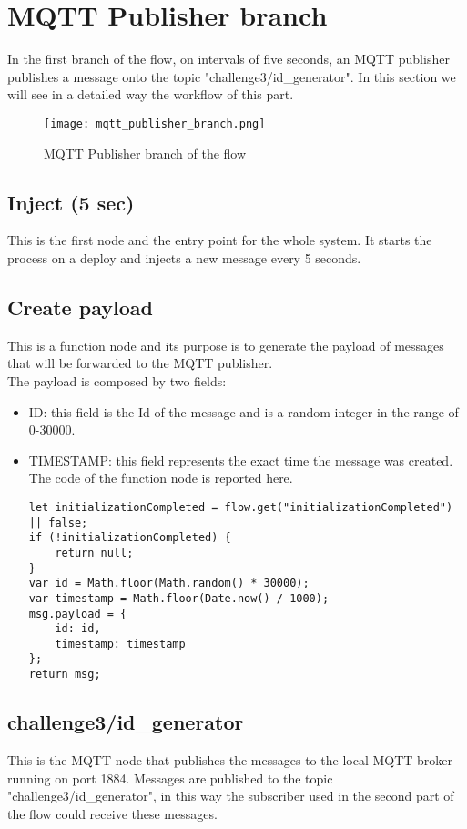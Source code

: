 \section{MQTT Publisher branch}
\label{sec:publisher_branch}
In the first branch of the flow, on intervals of five seconds, an MQTT publisher publishes a message onto the topic "challenge3/id\_generator". In this section we will see in a detailed way the workflow of this part.
\begin{figure}[H]
    \centering
    \texttt{[image: mqtt\_publisher\_branch.png]}
    \caption{MQTT Publisher branch of the flow}
\end{figure}

\subsection{Inject (5 sec)}
This is the first node and the entry point for the whole system. It starts the process on a deploy and injects a new message every 5 seconds.

\subsection{Create payload}
This is a function node and its purpose is to generate the payload of messages that will be forwarded to the MQTT publisher. \\
The payload is composed by two fields:
\begin{itemize}
\item ID: this field is the Id of the message and is a random integer in the range of 0-30000.
\item TIMESTAMP: this field represents the exact time the message was created.
The code of the function node is reported here.
\begin{verbatim}
let initializationCompleted = flow.get("initializationCompleted") || false;
if (!initializationCompleted) {
    return null;    
}
var id = Math.floor(Math.random() * 30000);
var timestamp = Math.floor(Date.now() / 1000);
msg.payload = {
    id: id,
    timestamp: timestamp
};
return msg;
\end{verbatim}
\end{itemize}

\subsection{challenge3/id\_generator}
This is the MQTT node that publishes the messages to the local MQTT broker running on port 1884. Messages are published to the topic "challenge3/id\_generator", in this way the subscriber used in the second part of the flow could receive these messages.

